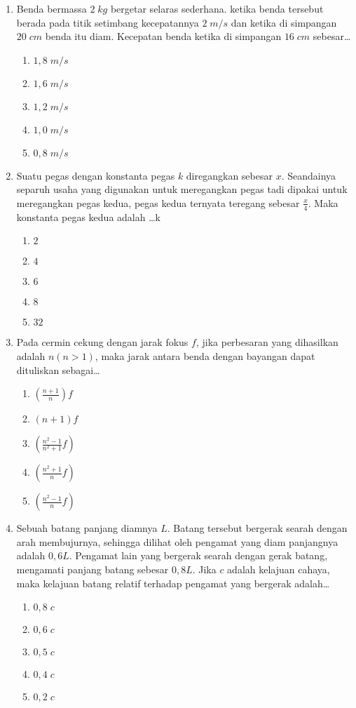 \documentclass[A4,12PT, english, twocolumn]{journal}
\begin{document}
\begin{enumerate}
\item Benda bermassa $2 \; kg$ bergetar selaras sederhana. ketika benda tersebut berada pada titik setimbang kecepatannya $2 \; m/s$ dan ketika di simpangan $20 \; cm$ benda itu diam. Kecepatan benda ketika di simpangan $16 \; cm$ sebesar\dots
    \begin{enumerate}
        \item $1,8 \; m/s$
        \item $1,6 \; m/s$
        \item $1,2 \; m/s$
        \item $1,0 \; m/s$
        \item $0,8 \; m/s$
    \end{enumerate}

\item Suatu pegas dengan konstanta pegas $k$ diregangkan sebesar $x$. Seandainya separuh usaha yang digunakan untuk meregangkan pegas tadi dipakai untuk meregangkan pegas kedua, pegas kedua ternyata teregang sebesar $\frac{x}{4}$. Maka konstanta pegas kedua adalah \dots k 
    \begin{enumerate}
        \item $2$
        \item $4$
        \item $6$
        \item $8$
        \item $32$
    \end{enumerate}
 
\item Pada cermin cekung dengan jarak fokus $f$, jika perbesaran yang dihasilkan adalah $n\left( n > 1 \right)$, maka jarak antara benda dengan bayangan dapat dituliskan sebagai\dots
    \begin{enumerate}
        \item $\left( \frac{n+1}{n} \right) f$
        \item $\left( n+1 \right) f$
        \item $\left( \frac{n^2-1}{n^2+1} f \right)$
        \item $\left( \frac{n^2+1}{n} f \right)$
        \item $\left( \frac{n^2-1}{n} f \right)$
    \end{enumerate}

\item Sebuah batang panjang diamnya $L$. Batang tersebut bergerak searah dengan arah membujurnya, sehingga dilihat oleh pengamat yang diam panjangnya adalah $0,6L$. Pengamat lain yang bergerak searah dengan gerak batang, mengamati panjang batang sebesar $0,8L$. Jika $c$ adalah kelajuan cahaya, maka kelajuan batang relatif terhadap pengamat yang bergerak adalah\dots
    \begin{enumerate}
        \item $0,8 \; c$
        \item $0,6 \; c$
        \item $0,5 \; c$
        \item $0,4 \; c$
        \item $0,2 \; c$
    \end{enumerate}


\end{enumerate}
\end{document}
